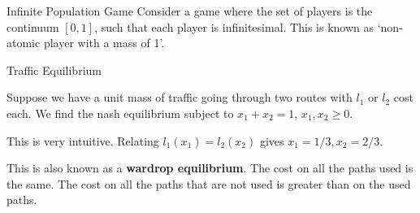 \begin{aexample}{Infinite Population Game}{}
    Consider a game where the set of players is the continuum $[0,1]$, such that each player is infinitesimal. This is known as `non-atomic player with a mass of 1'. 
\end{aexample}
\begin{aexample}{Traffic Equilibrium}{}
    \begin{center}
    \end{center}
    Suppose we have a unit mass of traffic going through two routes with $l_1$ or $l_2$ cost each. We find the nash equilibrium subject to $x_1+x_2=1$, $x_1,x_2\geq 0$. 
\end{aexample}
This is very intuitive. Relating $l_1(x_1)=l_2(x_2)$ gives $x_1=1/3,x_2=2/3$.
\begin{remark}
    This is also known as a \textbf{wardrop equilibrium}. The cost on all the paths used is the same. The cost on all the paths that are not used is greater than on the used paths.
\end{remark}

